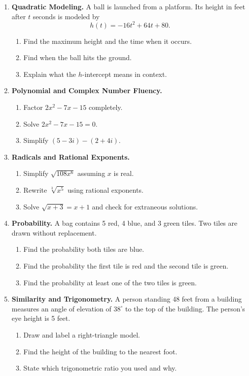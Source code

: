 \documentclass[11pt]{article}
\newcommand{\longwork}{\vspace{4.2cm}}
\begin{document}
\begin{enumerate}
\item \textbf{Quadratic Modeling.} A ball is launched from a platform. Its height in feet after $t$ seconds is modeled by
\[
h(t)=-16t^2+64t+80.
\]
\begin{enumerate}[label=(\alph*)]
\item Find the maximum height and the time when it occurs.
\item Find when the ball hits the ground.
\item Explain what the $h$-intercept means in context.
\end{enumerate}
\longwork

\item \textbf{Polynomial and Complex Number Fluency.} 
\begin{enumerate}[label=(\alph*)]
\item Factor $2x^2-7x-15$ completely.
\item Solve $2x^2-7x-15=0$.
\item Simplify $(5-3i)-(2+4i)$.
\end{enumerate}
\longwork

\newpage
\item \textbf{Radicals and Rational Exponents.}
\begin{enumerate}[label=(\alph*)]
\item Simplify $\sqrt{108x^6}$ assuming $x$ is real.
\item Rewrite $\sqrt[3]{x^5}$ using rational exponents.
\item Solve $\sqrt{x+3}=x+1$ and check for extraneous solutions.
\end{enumerate}
\longwork

\item \textbf{Probability.} A bag contains 5 red, 4 blue, and 3 green tiles. Two tiles are drawn without replacement.
\begin{enumerate}[label=(\alph*)]
\item Find the probability both tiles are blue.
\item Find the probability the first tile is red and the second tile is green.
\item Find the probability at least one of the two tiles is green.
\end{enumerate}
\longwork

\newpage
\item \textbf{Similarity and Trigonometry.} A person standing 48 feet from a building measures an angle of elevation of $38^\circ$ to the top of the building. The person's eye height is 5 feet.
\begin{enumerate}[label=(\alph*)]
\item Draw and label a right-triangle model.
\item Find the height of the building to the nearest foot.
\item State which trigonometric ratio you used and why.
\end{enumerate}
\longwork


\end{enumerate}
\end{document}
